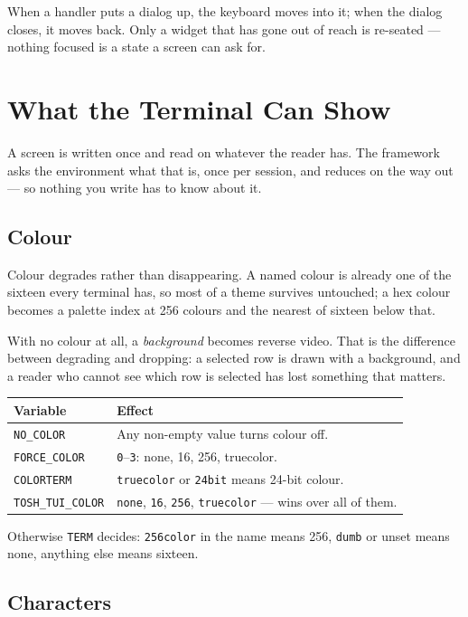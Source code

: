 \documentclass[11pt,a4paper,twoside,openany]{book}
\newcommand{\code}[1]{\texttt{\small #1}}
\begin{document}
When a handler puts a dialog up, the keyboard moves into it; when the dialog
closes, it moves back. Only a widget that has gone out of reach is re-seated ---
nothing focused is a state a screen can ask for.

\section{What the Terminal Can Show}

A screen is written once and read on whatever the reader has. The framework asks the
environment what that is, once per session, and reduces on the way out --- so nothing
you write has to know about it.

\subsection{Colour}

Colour degrades rather than disappearing. A named colour is already one of the
sixteen every terminal has, so most of a theme survives untouched; a hex colour
becomes a palette index at 256 colours and the nearest of sixteen below that.

With no colour at all, a \emph{background} becomes reverse video. That is the
difference between degrading and dropping: a selected row is drawn with a background,
and a reader who cannot see which row is selected has lost something that matters.

\begin{center}
\begin{tabular}{@{}ll@{}}
\toprule
Variable & Effect \\
\midrule
\code{NO\_COLOR} & Any non-empty value turns colour off. \\
\code{FORCE\_COLOR} & \code{0}--\code{3}: none, 16, 256, truecolor. \\
\code{COLORTERM} & \code{truecolor} or \code{24bit} means 24-bit colour. \\
\code{TOSH\_TUI\_COLOR} & \code{none}, \code{16}, \code{256}, \code{truecolor} --- wins over all of them. \\
\bottomrule
\end{tabular}
\end{center}

\noindent Otherwise \code{TERM} decides: \code{256color} in the name means 256,
\code{dumb} or unset means none, anything else means sixteen.

\subsection{Characters}
\end{document}
